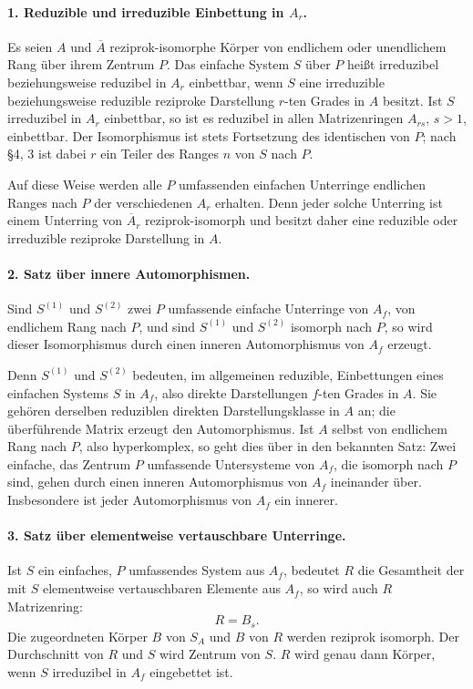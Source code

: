 \documentclass[11pt]{article}
\begin{document}
\paragraph{1. Reduzible und irreduzible Einbettung in \(A_r\).}
Es seien \(A\) und \(\overline A\) reziprok-isomorphe Körper von endlichem oder unendlichem Rang über ihrem Zentrum \(P\). Das einfache System \(S\) über \(P\) heißt irreduzibel beziehungsweise reduzibel in \(A_r\) einbettbar, wenn \(S\) eine irreduzible beziehungsweise reduzible reziproke Darstellung \(r\)-ten Grades in \(A\) besitzt. Ist \(S\) irreduzibel in \(A_r\) einbettbar, so ist es reduzibel in allen Matrizenringen \(A_{rs}\), \(s>1\), einbettbar. Der Isomorphismus ist stets Fortsetzung des identischen von \(P\); nach §4, 3 ist dabei \(r\) ein Teiler des Ranges \(n\) von \(S\) nach \(P\).

Auf diese Weise werden alle \(P\) umfassenden einfachen Unterringe endlichen Ranges nach \(P\) der verschiedenen \(A_r\) erhalten. Denn jeder solche Unterring ist einem Unterring von \(\overline A_r\) reziprok-isomorph und besitzt daher eine reduzible oder irreduzible reziproke Darstellung in \(A\).

\paragraph{2. Satz über innere Automorphismen.}
Sind \(S^{(1)}\) und \(S^{(2)}\) zwei \(P\) umfassende einfache Unterringe von \(A_f\), von endlichem Rang nach \(P\), und sind \(S^{(1)}\) und \(S^{(2)}\) isomorph nach \(P\), so wird dieser Isomorphismus durch einen inneren Automorphismus von \(A_f\) erzeugt.

Denn \(S^{(1)}\) und \(S^{(2)}\) bedeuten, im allgemeinen reduzible, Einbettungen eines einfachen Systems \(S\) in \(A_f\), also direkte Darstellungen \(f\)-ten Grades in \(A\). Sie gehören derselben reduziblen direkten Darstellungsklasse in \(A\) an; die überführende Matrix erzeugt den Automorphismus. Ist \(A\) selbst von endlichem Rang nach \(P\), also hyperkomplex, so geht dies über in den bekannten Satz: Zwei einfache, das Zentrum \(P\) umfassende Untersysteme von \(A_f\), die isomorph nach \(P\) sind, gehen durch einen inneren Automorphismus von \(A_f\) ineinander über. Insbesondere ist jeder Automorphismus von \(A_f\) ein innerer.

\paragraph{3. Satz über elementweise vertauschbare Unterringe.}
Ist \(S\) ein einfaches, \(P\) umfassendes System aus \(A_f\), bedeutet \(R\) die Gesamtheit der mit \(S\) elementweise vertauschbaren Elemente aus \(A_f\), so wird auch \(R\) Matrizenring:
\[
        R=B_s.
\]
Die zugeordneten Körper \(B\) von \(S_A\) und \(B\) von \(R\) werden reziprok isomorph. Der Durchschnitt von \(R\) und \(S\) wird Zentrum von \(S\). \(R\) wird genau dann Körper, wenn \(S\) irreduzibel in \(A_f\) eingebettet ist.
\end{document}
